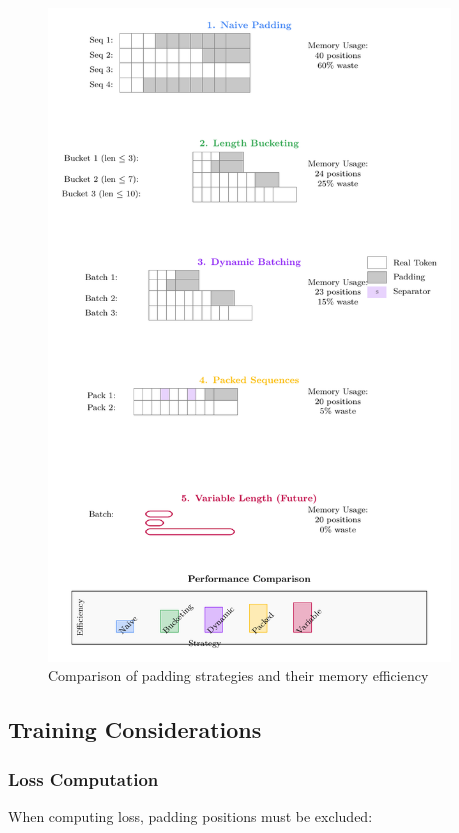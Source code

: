 \begin{figure}[h]
\centering
\includegraphics[width=0.95\textwidth]{part1/chapter02/fig_padding_strategies.pdf}
\caption{Comparison of padding strategies and their memory efficiency}
\end{figure}

\subsection{Training Considerations}

\subsubsection{Loss Computation}
When computing loss, padding positions must be excluded:

